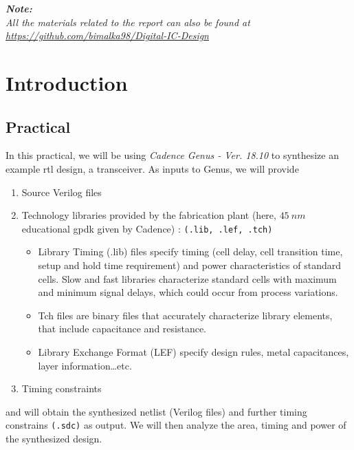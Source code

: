 \documentclass[a4paper,11pt]{article}%
\begin{document}


\pagebreak

\tableofcontents
\listoffigures
\listoftables

\vfill

\textit{\textbf{Note:}}\\
\textit{All the materials related to the report can also be found at \url{https://github.com/bimalka98/Digital-IC-Design}}
\pagebreak


\pagebreak
\section{Introduction}

\subsection{Practical}
In this practical, we will be using \textit{Cadence Genus - Ver. 18.10 } to synthesize an example \ac{rtl} design, a transceiver. As inputs to Genus, we will provide

\begin{enumerate}
	\item Source Verilog files
	\item Technology libraries provided by the fabrication plant (here, $45~nm$ educational \ac{gpdk} given by Cadence) : {\tt (.lib, .lef, .tch)}
	
	\begin{itemize}
		\item Library Timing (.lib) files specify timing (cell delay, cell transition time, setup and hold time requirement) and power characteristics of standard cells. Slow and fast libraries 	characterize standard cells with maximum and minimum signal delays, which could occur from process variations.

		\item Tch files are binary files that accurately characterize library elements, that include  capacitance and resistance.
		
		\item Library Exchange Format (LEF) specify design rules, metal capacitances, layer information…etc.
	\end{itemize}
	
	\item Timing constraints
\end{enumerate}

and will obtain the synthesized netlist (Verilog files) and further timing constrains {\tt (.sdc)} as output. We will then analyze the area, timing and power of the synthesized design.
\end{document}
